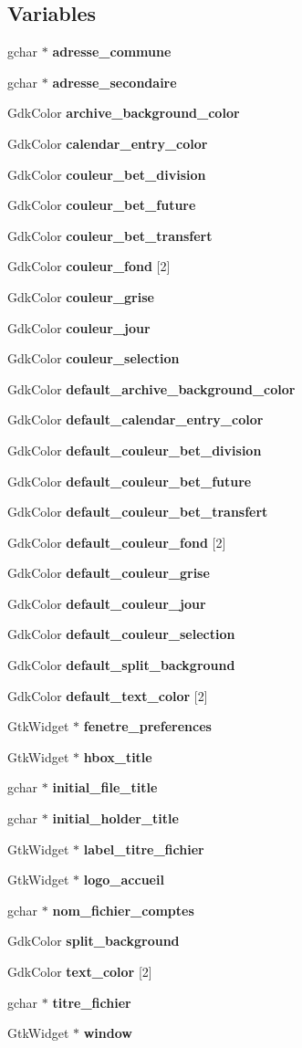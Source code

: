 \subsection*{Variables}
\begin{DoxyCompactItemize}
\item 
gchar $\ast$ {\bf adresse\_\-commune}
\item 
gchar $\ast$ {\bf adresse\_\-secondaire}
\item 
GdkColor {\bf archive\_\-background\_\-color}
\item 
GdkColor {\bf calendar\_\-entry\_\-color}
\item 
GdkColor {\bf couleur\_\-bet\_\-division}
\item 
GdkColor {\bf couleur\_\-bet\_\-future}
\item 
GdkColor {\bf couleur\_\-bet\_\-transfert}
\item 
GdkColor {\bf couleur\_\-fond} [2]
\item 
GdkColor {\bf couleur\_\-grise}
\item 
GdkColor {\bf couleur\_\-jour}
\item 
GdkColor {\bf couleur\_\-selection}
\item 
GdkColor {\bf default\_\-archive\_\-background\_\-color}
\item 
GdkColor {\bf default\_\-calendar\_\-entry\_\-color}
\item 
GdkColor {\bf default\_\-couleur\_\-bet\_\-division}
\item 
GdkColor {\bf default\_\-couleur\_\-bet\_\-future}
\item 
GdkColor {\bf default\_\-couleur\_\-bet\_\-transfert}
\item 
GdkColor {\bf default\_\-couleur\_\-fond} [2]
\item 
GdkColor {\bf default\_\-couleur\_\-grise}
\item 
GdkColor {\bf default\_\-couleur\_\-jour}
\item 
GdkColor {\bf default\_\-couleur\_\-selection}
\item 
GdkColor {\bf default\_\-split\_\-background}
\item 
GdkColor {\bf default\_\-text\_\-color} [2]
\item 
GtkWidget $\ast$ {\bf fenetre\_\-preferences}
\item 
GtkWidget $\ast$ {\bf hbox\_\-title}
\item 
gchar $\ast$ {\bf initial\_\-file\_\-title}
\item 
gchar $\ast$ {\bf initial\_\-holder\_\-title}
\item 
GtkWidget $\ast$ {\bf label\_\-titre\_\-fichier}
\item 
GtkWidget $\ast$ {\bf logo\_\-accueil}
\item 
gchar $\ast$ {\bf nom\_\-fichier\_\-comptes}
\item 
GdkColor {\bf split\_\-background}
\item 
GdkColor {\bf text\_\-color} [2]
\item 
gchar $\ast$ {\bf titre\_\-fichier}
\item 
GtkWidget $\ast$ {\bf window}
\end{DoxyCompactItemize}


